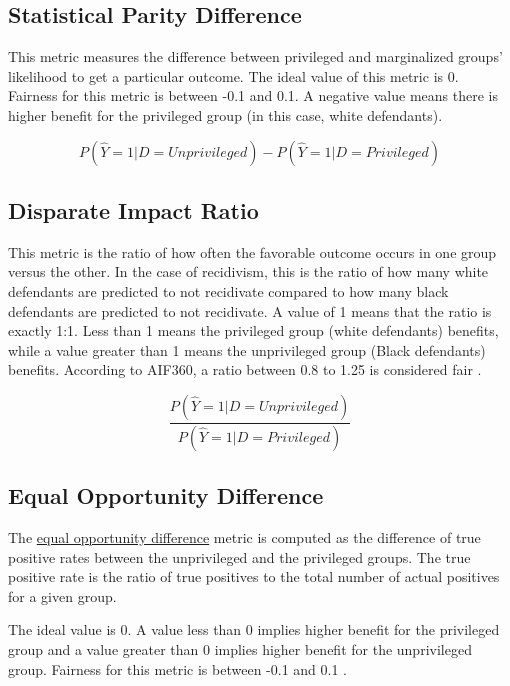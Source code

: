 \documentclass[water,article,submit,moreauthors,pdftex]{mdpi}
\begin{document}
\hypertarget{statistical-parity-difference}{%
\subsection{Statistical Parity
Difference}\label{statistical-parity-difference}}

This metric measures the difference between privileged and marginalized
groups' likelihood to get a particular outcome. The ideal value of this
metric is 0. Fairness for this metric is between -0.1 and 0.1. A
negative value means there is higher benefit for the privileged group
(in this case, white defendants).

\[P(\hat{Y}=1|D=Unprivileged) - P(\hat{Y}=1|D=Privileged)\]

\hypertarget{disparate-impact-ratio}{%
\subsection{Disparate Impact Ratio}\label{disparate-impact-ratio}}

This metric is the ratio of how often the favorable outcome occurs in
one group versus the other. In the case of recidivism, this is the ratio
of how many white defendants are predicted to not recidivate compared to
how many black defendants are predicted to not recidivate. A value of 1
means that the ratio is exactly 1:1. Less than 1 means the privileged
group (white defendants) benefits, while a value greater than 1 means
the unprivileged group (Black defendants) benefits. According to AIF360,
a ratio between 0.8 to 1.25 is considered fair \citep{Ronaghan2019AI}.

\[\frac{P(\hat{Y}=1|D=Unprivileged)}{P(\hat{Y}=1|D=Privileged)}\]

\hypertarget{equal-opportunity-difference}{%
\subsection{Equal Opportunity
Difference}\label{equal-opportunity-difference}}

The
\href{https://developers.google.com/machine-learning/glossary/fairness\#e}{equal
opportunity difference} metric is computed as the difference of true
positive rates between the unprivileged and the privileged groups. The
true positive rate is the ratio of true positives to the total number of
actual positives for a given group.

The ideal value is 0. A value less than 0 implies higher benefit for the
privileged group and a value greater than 0 implies higher benefit for
the unprivileged group. Fairness for this metric is between -0.1 and 0.1
\citep{aif360-oct-2018}.
\end{document}
